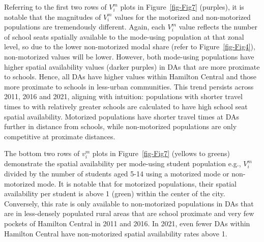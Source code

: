 \documentclass[
default
]{sn-jnl}
\begin{document}
Referring to the first two rows of \(V_i^m\) plots in
Figure~\ref{fig-Fig7} (purples), it is notable that the magnitudes of
\(V_i^m\) values for the motorized and non-motorized populations are
tremendously different. Again, each \(V_i^m\) value reflects the number
of school seats spatially available to the mode-using population at that
zonal level, so due to the lower non-motorized modal share (refer to
Figure~\ref{fig-Fig4}), non-motorized values will be lower. However,
both mode-using populations have higher spatial availability values
(darker purples) in DAs that are more proximate to schools. Hence, all
DAs have higher values within Hamilton Central and those more proximate
to schools in less-urban communities. This trend persists across 2011,
2016 and 2021, aligning with intuition: populations with shorter travel
times to with relatively greater schools are calculated to have high
school seat spatial availability. Motorized populations have shorter
travel times at DAs further in distance from schools, while
non-motorized populations are only competitive at proximate distances.

The bottom two rows of \(v_i^m\) plots in Figure~\ref{fig-Fig7} (yellows
to greens) demonstrate the spatial availability per mode-using student
population e.g., \(V_i^m\) divided by the number of students aged 5-14
using a motorized mode or non-motorized mode. It is notable that for
motorized populations, their spatial availability per student is above 1
(green) within the center of the city. Conversely, this rate is only
available to non-motorized populations in DAs that are in less-densely
populated rural areas that are school proximate and very few pockets of
Hamilton Central in 2011 and 2016. In 2021, even fewer DAs within
Hamilton Central have non-motorized spatial availability rates above 1.
\end{document}
